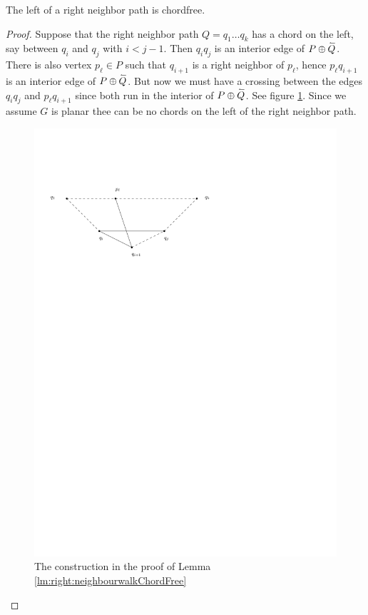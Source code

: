     \begin{lemma}
      \label{lm:right:neighbourwalkChordFree}
      The left of a right neighbor path is chordfree.
    \end{lemma}
    \begin{proof}
      Suppose that the right neighbor path $Q = q_1 \ldots q_k$  has a chord on the left, say between $q_i$ and $q_j$ with $i< j -1 $. Then $q_i q_j$ is an interior edge of $P \oplus \accentset{\leftharpoonup}{Q}$.  There is also vertex $p_\ell \in P$ such that $q_{i+1}$ is a right neighbor of $p_\ell$, hence $p_\ell q_{i+1}$ is an interior edge of $P \oplus \accentset{\leftharpoonup}{Q}$.  But now we must have a crossing between the edges $q_i q_j$ and $p_\ell q_{i+1}$ since both run in the interior of $P \oplus \accentset{\leftharpoonup}{Q}$.
      See figure \ref{fig:uni:neihbourwalkChordFree}.
      Since we assume $G$ is planar thee can be no chords on the left of the right neighbor path.

      \begin{figure}[h]
        \centering
        \includegraphics[scale=1]{unifiedAlgo/img/rightNeighbourwalk/neighbourWalkChords}
        \caption{The construction in the proof of Lemma \ref{lm:right:neighbourwalkChordFree}}
        \label{fig:uni:neihbourwalkChordFree}
      \end{figure}
    \end{proof}
